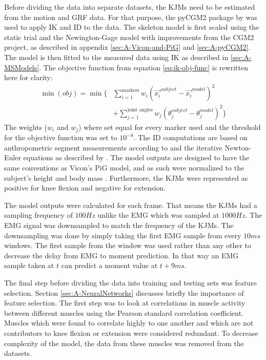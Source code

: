 \documentclass[../main.tex]{subfiles}
\begin{document}
Before dividing the data into separate datasets, the \acp{KJM} need to be estimated from the motion and \ac{GRF} data.
For that purpose, the pyCGM2 package by \textcite{Leboeuf2019} was used to apply \ac{IK} and \ac{ID} to the data.
The skeleton model is first scaled using the static trial and the Newington-Gage model with improvements from the CGM2 project, as described in appendix \ref{sec:A-Vicon-and-PiG} and \ref{sec:A-pyCGM2}.
The model is then fitted to the measured data using \ac{IK} as described in \ref{sec:A-MSModels}. 
The objective function from equation \ref{eq:ik-obj-func} is rewritten here for clarity:
\begin{align*}
    \min(obj) = \min\biggl\{ &\sum_{i=1}^{\text{markers}}w_i \left(\Vec{x_i}^{subject}-\Vec{x_i}^{model}\right)^2 \nonumber\\ 
    &+ \sum_{j=1}^{\text{joint angles}}w_j \left( \theta_j^{subject}-\theta_j^{model}\right)^2 \biggr\}
\end{align*}
The weights ($w_i$ and $w_j$) where set equal for every marker used and the threshold for the objective function was set to $10^{-8}$.
The \ac{ID} computations are based on anthropometric segment measurements according to \textcite{Dempster1955} and the iterative Newton-Euler equations as described by \textcite{Dumas2004}.
The model outputs are designed to have the same conventions as Vicon's \ac{PiG} model, and as such were normalized to the subject's height and body mass \cite{Leboeuf2019, viconpig}.
Furthermore, the \acp{KJM} were represented as positive for knee flexion and negative for extension.

The model outputs were calculated for each frame.
That means the \acp{KJM} had a sampling frequency of $100Hz$ unlike the \ac{EMG} which was sampled at $1000Hz$.
The \ac{EMG} signal was downsampled to match the frequency of the \acp{KJM}. 
The downsampling was done by simply taking the first \ac{EMG} sample from every $10ms$ windows. 
The first sample from the window was used rather than any other to decrease the delay from \ac{EMG} to moment prediction. 
In that way an \ac{EMG} sample taken at $t$ can predict a moment value at $t+9ms$. 

The final step before dividing the data into training and testing sets was feature selection.
Section \ref{sec:A-NeuralNetworks} discusses briefly the importance of feature selection.
The first step was to look at correlations in muscle activity between different muscles using the Pearson standard correlation coefficient.
Muscles which were found to correlate highly to one another and which are not contributors to knee flexion or extension were considered redundant.
To decrease complexity of the model, the data from these muscles was removed from the datasets.
\end{document}
